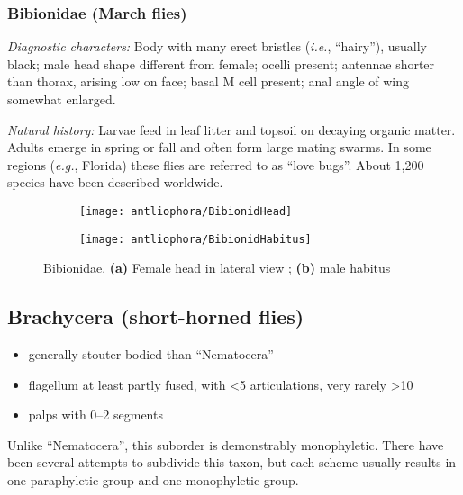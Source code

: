 \subsubsection{Bibionidae (March flies)}
\noindent{}\textit{Diagnostic characters:} Body with many erect bristles (\textit{i.e.}, ``hairy''), usually black; male head shape different from female; ocelli present; antennae shorter than thorax, arising low on face; basal M cell present; anal angle of wing somewhat enlarged.\vspace{3mm}

\noindent{}\textit{Natural history:} Larvae feed in leaf litter and topsoil on decaying organic matter. Adults emerge in spring or fall and often form large mating swarms. In some regions (\textit{e.g.}, Florida) these flies are referred to as ``love bugs''. About 1,200 species have been described worldwide.

\begin{figure}[ht!]
    \centering
    \begin{subfigure}[ht!]{0.25\textwidth}
        \texttt{[image: antliophora/BibionidHead]}
        \caption{}
        \label{fig:bibionid1}
    \end{subfigure}
    \qquad
    \begin{subfigure}[ht!]{0.47\textwidth}
        \texttt{[image: antliophora/BibionidHabitus]}
        \caption{}
        \label{fig:bibionid2}
    \end{subfigure}
    \caption{Bibionidae. \textbf{(a)} Female head in lateral view \citep[][Fig. 13.3]{mcalpine1981manual}; \textbf{(b)} male habitus \citep[][Fig. 13.1]{mcalpine1981manual}}\label{fig:bibionids}
\end{figure}

\subsection{Brachycera (short-horned flies)}
\begin{itemize}
\item generally stouter bodied than ``Nematocera''
\item flagellum at least partly fused, with \textless5 articulations, very rarely \textgreater10
\item palps with 0--2 segments
\end{itemize}
Unlike ``Nematocera'', this suborder is demonstrably monophyletic. There have been several attempts to subdivide this taxon, but each scheme usually results in one paraphyletic group and one monophyletic group.

